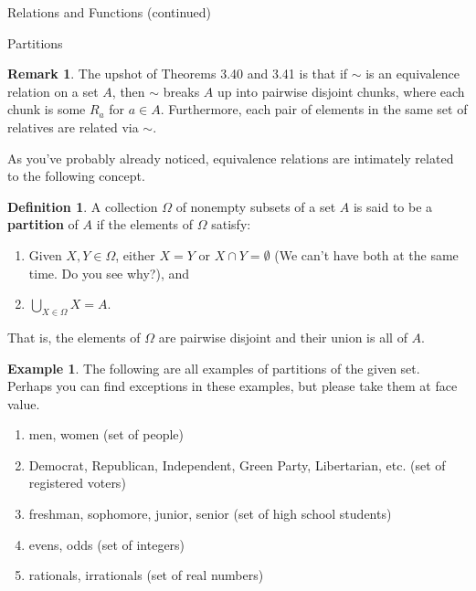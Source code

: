 \documentclass[11pt]{article}
\theoremstyle{definition}
\newtheorem{definition}[theorem]{Definition}
\newtheorem{example}[theorem]{Example}
\newtheorem{remark}[theorem]{Remark}
\begin{document}
\addtocounter{section}{3}

\begin{section}{Relations and Functions (continued)}

\addtocounter{subsection}{2}
\addtocounter{theorem}{46}

\begin{subsection}{Partitions}

\begin{remark}
The upshot of Theorems 3.40 and 3.41 is that if $\sim$ is an equivalence relation on a set $A$, then $\sim$ breaks $A$ up into pairwise disjoint chunks, where each chunk is some $R_{a}$ for $a\in A$. Furthermore, each  pair of elements in the same set of relatives are related via $\sim$.
\end{remark}

As you've probably already noticed, equivalence relations are intimately related to the following concept.

\begin{definition}
A collection $\Omega$ of nonempty subsets of a set $A$ is said to be a \textbf{partition} of $A$ if the elements of $\Omega$ satisfy:
\begin{enumerate}
\item Given $X,Y\in\Omega$, either $X=Y$ or $X\cap Y=\emptyset$ (We can't have both at the same time. Do you see why?), and
\item $\displaystyle \bigcup_{X\in\Omega}X=A$.
\end{enumerate}
That is, the elements of $\Omega$ are pairwise disjoint and their union is all of $A$.
\end{definition}

\begin{example}
The following are all examples of partitions of the given set.  Perhaps you can find exceptions in these examples, but please take them at face value.
\begin{enumerate}
\item men, women (set of people)
\item Democrat, Republican, Independent, Green Party, Libertarian, etc. (set of registered voters)
\item freshman, sophomore, junior, senior (set of high school students)
\item evens, odds (set of integers)
\item rationals, irrationals (set of real numbers)
\end{enumerate}
\end{example}


\end{subsection}
\end{section}
\end{document}
